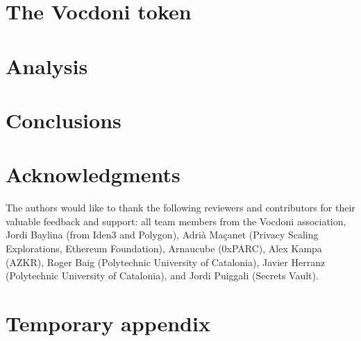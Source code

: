 \documentclass[runningheads, draft]{llncs}
\begin{document}
\section{The Vocdoni token}
\label{sec:token}


\section{Analysis}
\label{sec:analysis}


\section{Conclusions}
\label{sec:conclusions}


\section*{Acknowledgments}
\label{sec:acknowledgments}

The authors would like to thank the following reviewers and contributors for their valuable feedback and support: all team members from the Vocdoni association, Jordi Baylina (from Iden3 and Polygon), Adrià Maçanet (Privacy Scaling Explorations, Ethereum Foundation), Arnaucube (0xPARC), Alex Kampa (AZKR), Roger Baig (Polytechnic University of Catalonia), Javier Herranz (Polytechnic University of Catalonia), and Jordi Puiggali (Secrets Vault).






\newpage
\section*{Temporary appendix}

\end{document}
